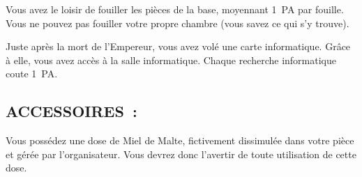 \documentclass[14pt,twocolumn]{extarticle}
\begin{document}
Vous avez le loisir de fouiller les pièces de la base, moyennant 1~PA par
fouille. Vous ne pouvez pas fouiller votre propre chambre (vous savez ce qui
s'y trouve).

Juste après la mort de l'Empereur, vous avez volé une carte informatique.
Grâce à elle, vous avez accès à la salle informatique. Chaque recherche
informatique coute 1~PA.

\subsection{ACCESSOIRES~:}

Vous possédez une dose de Miel de Malte, fictivement dissimulée dans votre
pièce et gérée par l'organisateur. Vous devrez donc l'avertir de toute
utilisation de cette dose.
\end{document}
